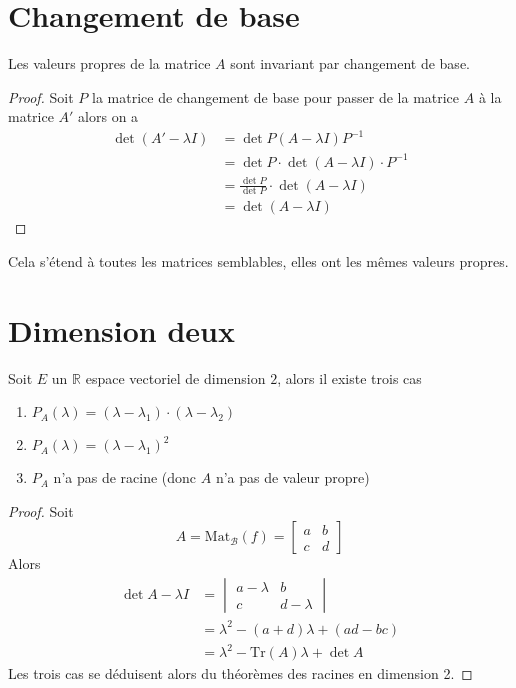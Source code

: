 \documentclass[11pt,colorlinks]{book}
\theoremstyle{mytheoremstyle}
\theoremstyle{mytheoremstyle}
\theoremstyle{mytheoremstyle}
\theoremstyle{mytheoremstyle}
\theoremstyle{mytheoremstyle}
\theoremstyle{mytheoremstyle}
\theoremstyle{mytheoremstyle}
\theoremstyle{mytheoremstyle}
\theoremstyle{myproblemstyle}
\def\mbb#1{\mathbb{#1}}
\def\mfc#1{\mathcal{#1}}
\def\bR{\mbb{R}}
\def\ev{espace vectoriel }
\begin{document}
\section{Changement de base}
\begin{prop}
  Les valeurs propres de la matrice $A$ sont invariant par changement de base.
  \begin{proof}
    Soit $P$ la matrice de changement de base pour passer de la matrice $A$ à la matrice $A'$ alors on a 
    \begin{align*}
      \det (A'-\lambda I) &= \det P (A-\lambda I) P^{-1} \\ 
      &= \det P \cdot \det (A-\lambda I) \cdot P^{-1} \\ 
      &= \frac{\det P}{\det P} \cdot \det (A-\lambda I) \\ 
      &= \det (A-\lambda I)
    \end{align*}
  \end{proof}
\end{prop}
\begin{rmq}
  Cela s'étend à toutes les matrices semblables, elles ont les mêmes valeurs propres.
\end{rmq}
\section{Dimension deux}
\begin{prop}
  Soit $E$ un $\bR$ \ev de dimension $2$, alors il existe trois cas 
  \begin{enumerate}
    \item $P_A(\lambda) = (\lambda - \lambda_1) \cdot (\lambda - \lambda_2)$
    \item $P_A(\lambda) = (\lambda - \lambda_1)^2$
    \item $P_A$ n'a pas de racine (donc $A$ n'a pas de valeur propre)
  \end{enumerate}
  \begin{proof}
    Soit 
    \begin{equation*}
      A = \text{Mat}_{\mfc{B}}(f) = \begin{bmatrix}
        a & b \\ 
        c & d
      \end{bmatrix} 
    \end{equation*}
    Alors 
    \begin{align*}
      \det A - \lambda I &= \begin{vmatrix}
        a - \lambda & b \\ 
        c & d - \lambda
      \end{vmatrix} \\ 
      &= \lambda^2 - (a+d)\lambda + (ad-bc) \\ 
      &= \lambda^2 - \text{Tr}(A) \lambda + \det A
    \end{align*}
    Les trois cas se déduisent alors du théorèmes des racines en dimension 2.
  \end{proof}
\end{prop}
\end{document}
